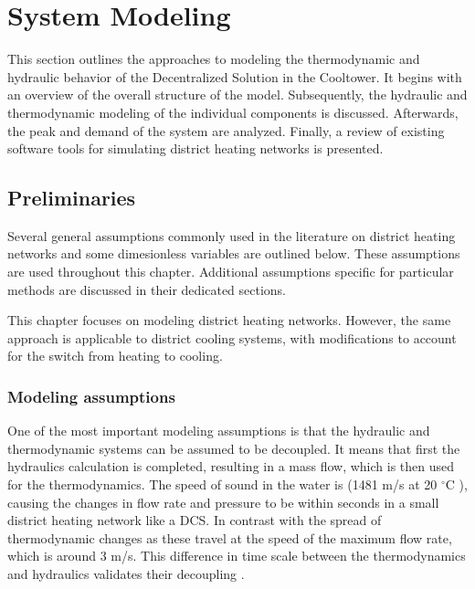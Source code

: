 \chapter{System Modeling}\label{chap::sysmodel}
This section outlines the approaches to modeling the thermodynamic and hydraulic behavior of the Decentralized Solution in the Cooltower. It begins with an overview of the overall structure of the model. Subsequently, the hydraulic and thermodynamic modeling of the individual components is discussed. 
Afterwards, the peak and demand of the system are analyzed. Finally, a review of existing software tools for simulating district heating networks is presented. 

\section{Preliminaries}\label{sec::preliminaries}
Several general assumptions commonly used in the literature on  district heating networks and some dimesionless variables are outlined below. These assumptions are used throughout this chapter. Additional assumptions specific for particular methods are discussed in their dedicated sections.

This chapter focuses on modeling district heating networks. However, the same approach is applicable to district cooling systems, with modifications to account for the switch from heating to cooling.

\subsection{Modeling assumptions}
One of the most important modeling assumptions is that the hydraulic and thermodynamic systems can be assumed to be decoupled. It means that first the hydraulics calculation is completed, resulting in a mass flow, which is then used for the thermodynamics. The speed of sound in the water is (1481 m/s at 20 $^{\circ}\text{C}$ \cite{speedofsound}), causing the changes in flow rate and pressure to be within seconds in a small district heating network like a DCS. In contrast with the spread of thermodynamic changes as these travel at the speed of the maximum flow rate, which is around 3 m/s. This difference in time scale between the thermodynamics and hydraulics validates their decoupling \cite{KUNTUAROVA}.

